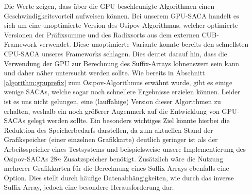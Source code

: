 Die Werte zeigen, dass über die GPU beschleunigte Algorithmen einen Geschwindigkeitsvorteil aufweisen können. Bei unserem GPU-SACA handelt es sich um eine unoptimierte Version des Osipov-Algorithmus, welcher optimierte Versionen der Präfixsumme und des Radixsorts aus dem externen CUB-Framework verwendet. Diese unoptimierte Variante konnte bereits den schnellsten CPU-SACA unseres Frameworks schlagen. Dies deutet darauf hin, dass die Verwendung der GPU zur Berechnung des Suffix-Arrays lohnenswert sein kann und daher näher untersucht werden sollte. Wie bereits in Abschnitt \ref{algorithm:gpuprefix} zum Osipov-Algorithmus erwähnt wurde, gibt es einige wenige SACAs, welche sogar noch schnellere Ergebnisse erzielen können. Leider ist es uns nicht gelungen, eine (lauffähige) Version dieser Algorithmen zu erhalten, weshalb ein noch größerer Augenmerk auf die Entwicklung von GPU-SACAs gelegt werden sollte. Ein besonders wichtiges Ziel könnte hierbei die Reduktion des Speicherbedarfs darstellen, da zum aktuellen Stand der Grafikspeicher (einer einzelnen Grafikkarte) deutlich geringer ist als der Arbeitsspeicher eines Testsystems und beispielsweise unsere Implementierung des Osipov-SACAs $28n$ Zusatzspeicher benötigt. Zusätzlich wäre die Nutzung mehrerer Grafikkarten für die Berechnung eines Suffix-Arrays ebenfalls eine Option. Dies stellt durch häufige Datenabhängigkeiten, wie durch das inverse Suffix-Array, jedoch eine besondere Herausforderung dar.